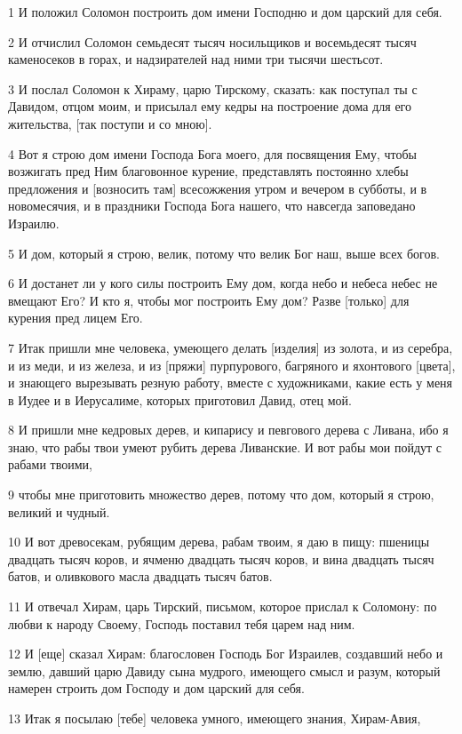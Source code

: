 \par 1 И положил Соломон построить дом имени Господню и дом царский для себя.
\par 2 И отчислил Соломон семьдесят тысяч носильщиков и восемьдесят тысяч каменосеков в горах, и надзирателей над ними три тысячи шестьсот.
\par 3 И послал Соломон к Хираму, царю Тирскому, сказать: как поступал ты с Давидом, отцом моим, и присылал ему кедры на построение дома для его жительства, [так поступи и со мною].
\par 4 Вот я строю дом имени Господа Бога моего, для посвящения Ему, чтобы возжигать пред Ним благовонное курение, представлять постоянно хлебы предложения и [возносить там] всесожжения утром и вечером в субботы, и в новомесячия, и в праздники Господа Бога нашего, что навсегда заповедано Израилю.
\par 5 И дом, который я строю, велик, потому что велик Бог наш, выше всех богов.
\par 6 И достанет ли у кого силы построить Ему дом, когда небо и небеса небес не вмещают Его? И кто я, чтобы мог построить Ему дом? Разве [только] для курения пред лицем Его.
\par 7 Итак пришли мне человека, умеющего делать [изделия] из золота, и из серебра, и из меди, и из железа, и из [пряжи] пурпурового, багряного и яхонтового [цвета], и знающего вырезывать резную работу, вместе с художниками, какие есть у меня в Иудее и в Иерусалиме, которых приготовил Давид, отец мой.
\par 8 И пришли мне кедровых дерев, и кипарису и певгового дерева с Ливана, ибо я знаю, что рабы твои умеют рубить дерева Ливанские. И вот рабы мои пойдут с рабами твоими,
\par 9 чтобы мне приготовить множество дерев, потому что дом, который я строю, великий и чудный.
\par 10 И вот древосекам, рубящим дерева, рабам твоим, я даю в пищу: пшеницы двадцать тысяч коров, и ячменю двадцать тысяч коров, и вина двадцать тысяч батов, и оливкового масла двадцать тысяч батов.
\par 11 И отвечал Хирам, царь Тирский, письмом, которое прислал к Соломону: по любви к народу Своему, Господь поставил тебя царем над ним.
\par 12 И [еще] сказал Хирам: благословен Господь Бог Израилев, создавший небо и землю, давший царю Давиду сына мудрого, имеющего смысл и разум, который намерен строить дом Господу и дом царский для себя.
\par 13 Итак я посылаю [тебе] человека умного, имеющего знания, Хирам-Авия,
